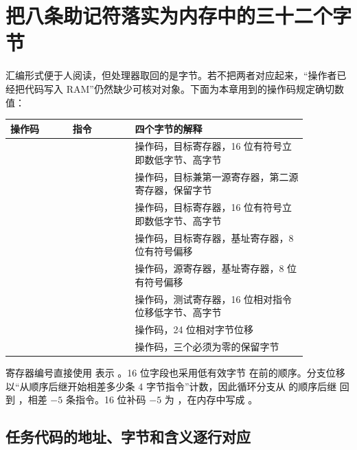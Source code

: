 \section{把八条助记符落实为内存中的三十二个字节}

汇编形式便于人阅读，但处理器取回的是字节。若不把两者对应起来，“操作者已经把代码写入
RAM”仍然缺少可核对对象。下面为本章用到的操作码规定确切数值：

\begin{longtable}{|L{0.18\linewidth}|L{0.18\linewidth}|L{0.50\linewidth}|}
\hline
{}
操作码 & 指令 & 四个字节的解释 \\ \hline
{} &  & 操作码，目标寄存器，16 位有符号立即数低字节、高字节 \\ \hline
{} &  & 操作码，目标兼第一源寄存器，第二源寄存器，保留字节 \\ \hline
{} &  & 操作码，目标寄存器，16 位有符号立即数低字节、高字节 \\ \hline
{} &  & 操作码，目标寄存器，基址寄存器，8 位有符号偏移 \\ \hline
{} &  & 操作码，源寄存器，基址寄存器，8 位有符号偏移 \\ \hline
{} &  & 操作码，测试寄存器，16 位相对指令位移低字节、高字节 \\ \hline
{} &  & 操作码，24 位相对字节位移 \\ \hline
{} &  & 操作码，三个必须为零的保留字节 \\ \hline
\end{longtable}

寄存器编号直接使用  表示 。16 位字段也采用低有效字节
在前的顺序。分支位移以“从顺序后继开始相差多少条 4 字节指令”计数，因此循环分支从
 的顺序后继  回到 ，相差
\(-5\) 条指令。16 位补码 \(-5\) 为 ，在内存中写成
。

\subsection{任务代码的地址、字节和含义逐行对应}

